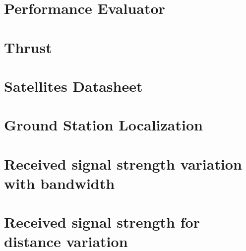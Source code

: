 \section{Performance Evaluator}
\label{PerformanceEvaluator}


\section{Thrust}
\label{Thrust}



\section{Satellites Datasheet}
\label{SatsDatashhet}


\section{Ground Station Localization}
\label{GSLocalization}



%
\section{Received signal strength variation with bandwidth}
\label{BvsS}



\section{Received signal strength for distance variation}
\label{friisCalc}




